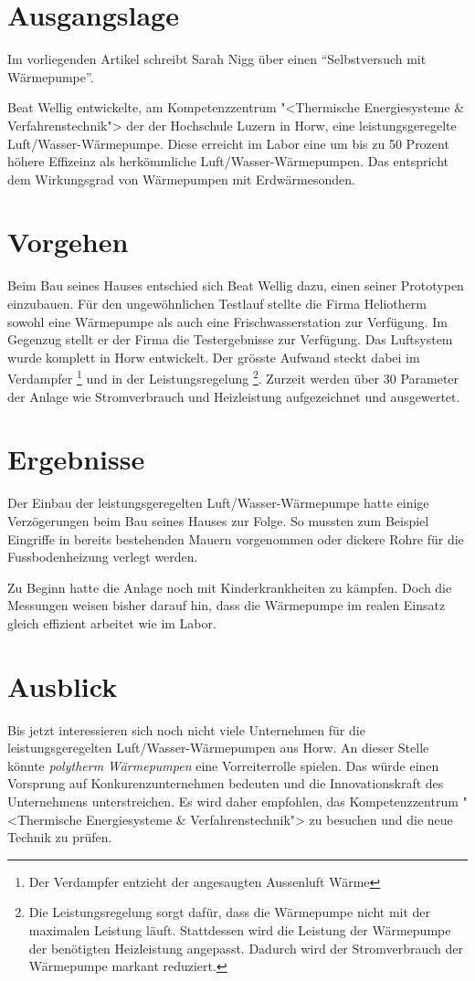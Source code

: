 
\section{Ausgangslage}
Im vorliegenden Artikel schreibt Sarah Nigg über einen "`Selbstversuch mit 
Wärmepumpe"'. 

Beat Wellig entwickelte, am Kompetenzzentrum "<Thermische Energiesysteme \& 
Verfahrenstechnik"> der der Hochschule Luzern in Horw, eine 
leistungsgeregelte Luft/Wasser-Wärmepumpe. Diese 
erreicht im Labor eine um bis zu 50 Prozent höhere Effizeinz als herkömmliche 
Luft/Wasser-Wärmepumpen. Das entspricht dem Wirkungsgrad von Wärmepumpen mit 
Erdwärmesonden. 

\section{Vorgehen}
Beim Bau seines Hauses entschied sich Beat Wellig dazu, einen seiner 
Prototypen einzubauen. Für den ungewöhnlichen Testlauf stellte die Firma 
Heliotherm sowohl eine Wärmepumpe als auch eine Frischwasserstation zur 
Verfügung. Im Gegenzug stellt er der Firma die Testergebnisse zur Verfügung. 
Das Luftsystem wurde komplett in Horw entwickelt. Der grösste Aufwand steckt 
dabei im Verdampfer
\footnote{Der Verdampfer entzieht der angesaugten Aussenluft Wärme} 
und in der Leistungsregelung
\footnote{Die Leistungsregelung sorgt dafür, dass die Wärmepumpe nicht mit der
maximalen Leistung läuft. Stattdessen wird die Leistung der Wärmepumpe der 
benötigten Heizleistung angepasst. Dadurch wird der Stromverbrauch der 
Wärmepumpe markant reduziert. }. 
Zurzeit werden über 30 Parameter der Anlage wie Stromverbrauch und 
Heizleistung aufgezeichnet und ausgewertet. 

\section{Ergebnisse}
Der Einbau der leistungsgeregelten Luft/Wasser-Wärmepumpe hatte einige 
Verzögerungen beim Bau seines Hauses zur Folge. So mussten zum Beispiel 
Eingriffe in bereits bestehenden Mauern vorgenommen oder dickere Rohre für 
die Fussbodenheizung verlegt werden. 

Zu Beginn hatte die Anlage noch mit Kinderkrankheiten zu kämpfen. Doch die 
Messungen weisen bisher darauf hin, dass die Wärmepumpe im realen Einsatz 
gleich effizient arbeitet wie im Labor. 

\section{Ausblick}
Bis jetzt interessieren sich noch nicht viele Unternehmen für die 
leistungsgeregelten Luft/Wasser-Wärmepumpen aus Horw. An dieser Stelle könnte 
\textit{polytherm Wärmepumpen} eine Vorreiterrolle spielen. Das würde einen 
Vorsprung auf Konkurenzunternehmen bedeuten und die Innovationskraft des 
Unternehmens unterstreichen. Es wird daher empfohlen, das Kompetenzzentrum 
"<Thermische Energiesysteme \& Verfahrenstechnik"> zu besuchen und die neue 
Technik zu prüfen. 
